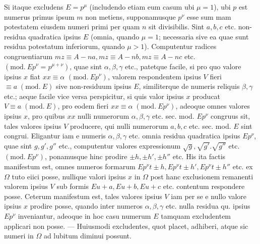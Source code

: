 Si itaque excludens \(E=p^\mu\) (includendo etiam eum casum ubi \(\mu=1\)), ubi \(p\) est numerus primus ipsum \(m\) non metiens, supponamusque \(p^\nu\) esse sum%
mam potestatem eiusdem numeri primi per quam \(n\) sit divisibilis. Sint \(a,\allowbreak b,\allowbreak c\) etc. non-residua quadratica ipsius \(E\) (omnia, quando \(\mu=1\); necessaria sive ea quae sunt residua potestatum inferiorum, quando \(\mu>1\)). Computentur radices congruentiarum \(mz\equiv A-na,\allowbreak mz\equiv A-nb,\allowbreak mz\equiv A-nc\) etc. \((\mathrm{mod.}\ Ep^\nu=p^{\mu+\nu})\), quae sint \(\alpha,\allowbreak \beta,\allowbreak \gamma\) etc., patetque facile, si pro quo valore ipsius \(x\) fiat \(xx\equiv\alpha\) \((\mathrm{mod.}\ Ep^\nu)\), valorem respondentem ipsius \(V\) fieri \(\equiv a\; (\mathrm{mod}.\ E)\) sive non-residuum ipsius \(E\), similiterque de numeris reliquis \(\beta,\allowbreak \gamma\) etc.; aeque facile vice versa perspicitur, si quis valor ipsius \(x\) producat \(V\equiv a\; (\mathrm{mod}.\ E)\), pro eodem fieri \(xx\equiv\alpha\; (\mathrm{mod}.\ Ep^\nu)\), adeoque omnes valores ipsius \(x\), pro quibus \(xx\) nulli numerorum \(\alpha,\allowbreak \beta,\allowbreak \gamma\) etc. sec. mod. \(Ep^\nu\) congruus sit, tales valores ipsius \(V\) producere, qui nulli numerorum \(a,\allowbreak b,\allowbreak c\) etc. sec. mod. \(E\) sint congrui. Eligantur iam e numeris \(\alpha,\allowbreak \beta,\allowbreak \gamma\) etc. omnia residua quadratica ipsius \(Ep^\nu\), quae sint \(g,\allowbreak g',\allowbreak g''\) etc., computentur valores expressionum \(\surd g,\allowbreak \surd{g'}.\surd{g''}\) etc. \((\mathrm{mod.}\ Ep^\nu)\), ponamusque hinc prodire \(\pm h,\allowbreak \pm h',\allowbreak \pm h''\) etc. His ita factis manifestum est, omnes numeros formarum \(Ep^\nu t\pm h,\allowbreak Ep^\nu t\pm h',\allowbreak Ep^\nu t\pm h''\) etc. ex \(\Omega\) tuto eiici posse, nullique valori ipsius \(x\) in \(\Omega\) post hanc exclusionem remanenti valorem ipsius \(V\) sub formis \(Eu+a,\allowbreak Eu+b,\allowbreak Eu+c\) etc. contentum respondere posse. Ceterum manifestum est, tales valores ipsius \(V\) iam per se e nullo valore ipsius \(x\) prodire posse, quando inter numeros \(\alpha,\allowbreak \beta,\allowbreak \gamma\) etc. nulla residua qu. ipsius \(Ep^\nu\) inveniantur, adeoque in hoc casu numerum \(E\) tamquam excludentem applicari non posse. — Huiusmodi excludentes, quot placet, adhiberi, atque sic numeri in \(\Omega\) ad lubitum diminui possunt.


